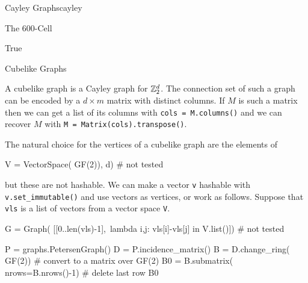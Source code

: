 \begin{chap}{Cayley Graphs}{cayley}
\begin{sect}{The 600-Cell}
\begin{sagecode}
\begin{sageoutput}
True
\end{sageoutput}
\end{sagecode}
%
\end{sect}
%
\begin{sect}{Cubelike Graphs}
%
\begin{para}
A cubelike graph is a Cayley graph for ${\mathbb Z}_2^d$. The connection
set of such a graph can be encoded by a $d\times m$ matrix with distinct
columns. If $M$ is such a matrix then we can get a list of its columns with \verb|cols = M.columns()| and we can recover $M$ with \verb|M = Matrix(cols).transpose()|.
\end{para}
%
\begin{para}
The natural choice for the vertices of a cubelike graph are the elements of
\end{para}
%
\begin{sagecode}
\begin{sageinput}
V = VectorSpace( GF(2)), d)  # not tested
\end{sageinput}
\end{sagecode}
%
\begin{para}
but these are not hashable. We can make a vector \verb|v| hashable with \verb|v.set_immutable()| and use vectors as vertices, or work as follows.  Suppose that \verb|vls| is a list of vectors from a vector space \verb|V|.
\end{para}
%
\begin{sagecode}
\begin{sageinput}
G = Graph( [[0..len(vls)-1],\
    lambda i,j: vls[i]-vls[j] in V.list()]) # not tested
\end{sageinput}
\end{sagecode}
%
\begin{sagecode}
\begin{sageinput}
P = graphs.PetersenGraph()
D = P.incidence_matrix()
B = D.change_ring( GF(2))  # convert to a matrix over GF(2)
B0 = B.submatrix( nrows=B.nrows()-1)  # delete last row
B0
\end{sageinput}
\begin{sageoutput}
[1 1 1 0 0 0 0 0 0 0 0 0 0 0 0]
[0 0 1 1 1 0 0 0 0 0 0 0 0 0 0]
[0 0 0 0 1 1 1 0 0 0 0 0 0 0 0]
[0 0 0 0 0 0 1 1 1 0 0 0 0 0 0]
[0 1 0 0 0 0 0 0 1 1 0 0 0 0 0]
[1 0 0 0 0 0 0 0 0 0 1 1 0 0 0]
[0 0 0 1 0 0 0 0 0 0 0 0 1 1 0]
[0 0 0 0 0 1 0 0 0 0 0 1 0 0 1]
[0 0 0 0 0 0 0 1 0 0 1 0 0 1 0]
\end{sageoutput}
\end{sagecode}
%
\begin{para}

\end{para}
\end{sect}
\end{chap}
